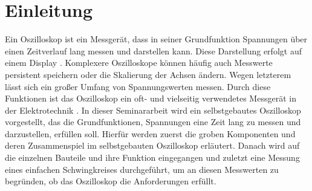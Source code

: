 \section{Einleitung}

Ein Oszilloskop ist ein Messgerät, dass in seiner Grundfunktion Spannungen
über einen Zeitverlauf lang messen und darstellen kann. \newline
Diese Darstellung erfolgt auf einem Display \cite{KnowUrOscilloscope}. \newline
Komplexere Oszilloskope können häufig auch Messwerte persistent speichern oder die Skalierung der Achsen
ändern. Wegen letzterem lässt sich ein großer Umfang von Spannungswerten messen.
Durch diese Funktionen ist das Oszilloskop ein oft- und vielseitig verwendetes Messgerät
in der Elektrotechnik \cite{ETechnikEinfach}. \newline \newline
In dieser Seminararbeit wird ein selbstgebautes Oszilloskop vorgestellt, das die Grundfunktionen,
Spannungen eine Zeit lang zu messen und darzustellen, erfüllen soll. \newline
Hierfür werden zuerst die groben Komponenten und deren Zusammenspiel im selbstgebauten Oszilloskop erläutert.
Danach wird auf die einzelnen Bauteile und ihre Funktion eingegangen und
zuletzt eine Messung eines einfachen Schwingkreises durchgeführt, um an diesen Messwerten zu begründen,
ob das Oszilloskop die Anforderungen erfüllt.  

